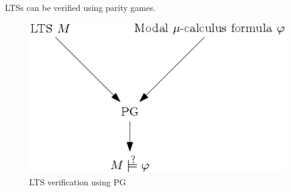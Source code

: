 LTSs can be verified using parity games.
\begin{figure}[h]
	\centering
	\includegraphics[scale=0.5]{Diagrams/LTSVerificationUsingPG}
	\caption[LTS verification using PG]{LTS verification using PG}
	\label{fig:ltsverificationusingpg}
\end{figure}
